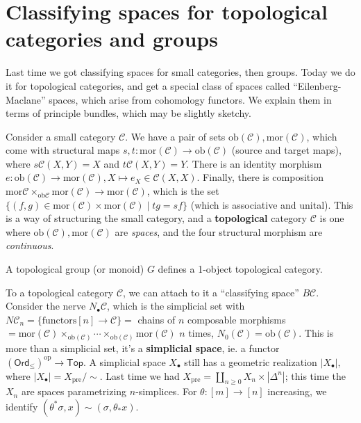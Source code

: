 \section{Classifying spaces for topological categories and groups}
Last time we got classifying spaces for small categories, then groups. Today we do it for topological categories, and get a special class of spaces called ``Eilenberg-Maclane'' spaces, which arise from cohomology functors. We explain them in terms of principle bundles, which may be slightly sketchy.

Consider a small category $\mathcal{C} $. We have a pair of sets $\mathrm{ob}(\mathcal{C} ), \mathrm{mor}(\mathcal{C} )$, which come with structural maps $s,t \colon \mathrm{mor}(\mathcal{C} ) \to \mathrm{ob}(\mathcal{C} )$ (source and target maps), where $s \mathcal{C} (X,Y)=X$ and $t\mathcal{C} (X,Y)=Y$. There is an identity morphism $e \colon \mathrm{ob}(\mathcal{C} ) \to \mathrm{mor}(\mathcal{C} ), X \mapsto  e_X \in \mathcal{C} (X,X)$. Finally, there is composition $\mathrm{mor}\mathcal{C} \times_{\mathrm{ob}\mathcal{C} } \mathrm{mor}(\mathcal{C}) \to \mathrm{mor}(\mathcal{C}) $, which is the set $\{\left( f,g \right) \in \mathrm{mor}(\mathcal{C} ) \times \mathrm{mor}(\mathcal{C} ) \mid tg=sf\} $ (which is associative and unital). This is a way of structuring the small category, and a \textbf{topological} category $\mathcal{C} $ is one where $\mathrm{ob}(\mathcal{C} ),\mathrm{mor}(\mathcal{C} )$ are \emph{spaces}, and the four structural morphism are \emph{continuous}.
\begin{example}
    A topological group (or monoid) $G$ defines a 1-object topological category.
\end{example}
To a topological category $\mathcal{C} $, we can attach to it a ``classifying space'' $B\mathcal{C} $. Consider the nerve $N_{\bullet}\mathcal{C} $, which is the simplicial set with $N \mathcal{C} _n = \{ \text{functors} [n] \to \mathcal{C} \} = $ chains of $n$ composable morphisms $= \mathrm{mor}(\mathcal{C} ) \times _{\mathrm{ob}(\mathcal{C} )}\cdots \times _{\mathrm{ob}(\mathcal{C} )}\mathrm{mor}(\mathcal{C} )$ $n$ times, $N_0(\mathcal{C} )=\mathrm{ob}(\mathcal{C} )$. This is more than a simplicial set, it's a \textbf{simplicial space}, ie. a functor $\left( \mathsf{Ord}_{\leq} \right) ^{\mathrm{op}} \to \mathsf{Top} $. A simplicial space $X_{\bullet}$ still has a geometric realization $|X_{\bullet}|,$ where $|X_{\bullet}|= X_{\mathrm{pre}}/\sim$. Last time we had $X_{\mathrm{pre}}=\coprod _{n \geq 0}X_n  \times |\Delta ^n |$; this time the $X_n $ are spaces parametrizing $n$-simplices. For $\theta \colon [m] \to [n]$ increasing, we identify $(\theta^* \sigma,x)\sim(\sigma,\theta_*x)$.

